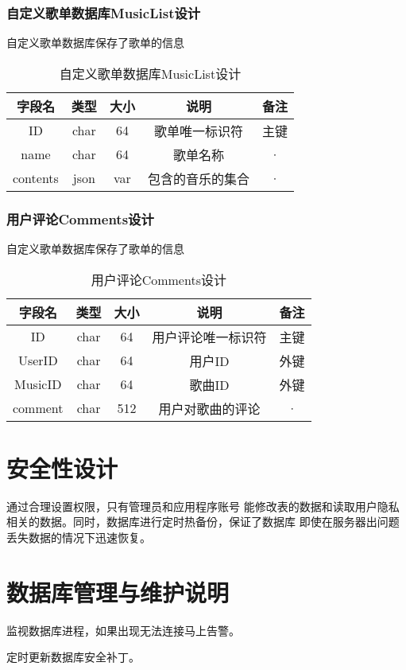 \subsubsection{自定义歌单数据库MusicList设计}

自定义歌单数据库保存了歌单的信息

\begin{table}[htbp]
	\centering
	\caption{自定义歌单数据库MusicList设计} \label{tab:music-list-database}
	\begin{tabular}{|c|c|c|c|c|}
		\hline
		字段名 & 类型 & 大小 & 说明 & 备注 \\
		\hline
		ID & char & 64 & 歌单唯一标识符 & 主键\\
		\hline
		name & char & 64 & 歌单名称 & · \\
		\hline
		contents & json & var & 包含的音乐的集合  & · \\
		\hline
	\end{tabular}
\end{table}

\subsubsection{用户评论Comments设计}

自定义歌单数据库保存了歌单的信息

\begin{table}[htbp]
	\centering
	\caption{用户评论Comments设计} \label{tab:music-list-database}
	\begin{tabular}{|c|c|c|c|c|}
		\hline
		字段名 & 类型 & 大小 & 说明 & 备注 \\
		\hline
		ID & char & 64 & 用户评论唯一标识符 & 主键 \\
		\hline
		UserID & char & 64 & 用户ID & 外键 \\
		\hline
		MusicID & char & 64 & 歌曲ID & 外键 \\
		\hline
		comment & char & 512 & 用户对歌曲的评论  & · \\
		\hline
	\end{tabular}
\end{table}

\section{安全性设计}	
通过合理设置权限，只有管理员和应用程序账号
能修改表的数据和读取用户隐私相关的数据。同时，数据库进行定时热备份，保证了数据库
即使在服务器出问题丢失数据的情况下迅速恢复。

\section{数据库管理与维护说明}
监视数据库进程，如果出现无法连接马上告警。

定时更新数据库安全补丁。